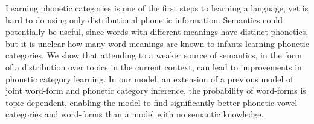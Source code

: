 Learning phonetic categories is one of the first steps to learning a language, yet is hard to do using only distributional phonetic information.  Semantics could potentially be useful, since words with different meanings have distinct phonetics, but it is unclear how many word meanings are known to infants learning phonetic categories.  We show that attending to a weaker source of semantics, in the form of a distribution over topics in the current context, can lead to improvements in phonetic category learning.  In our model, an extension of a previous model of joint word-form and phonetic category inference, the probability of word-forms is topic-dependent, enabling the model to find significantly better phonetic vowel categories and word-forms than a model with no semantic knowledge.
